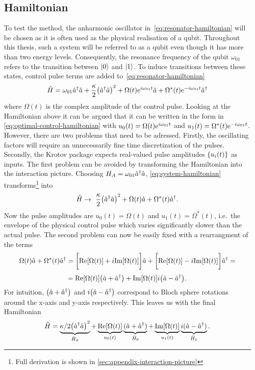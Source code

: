\documentclass[main.tex]{subfiles}
\begin{document}
\subsection{Hamiltonian}
To test the method, the anharmonic oscillator in~\cref{eq:resonator-hamiltonian} will be chosen as it is often used as the physical realisation of a qubit.
Throughout this thesis, such a system will be referred to as a qubit even though it has more than two energy levels.
Consequently, the resonance frequency of the qubit \( \omega_{01} \) refers to the transition between \( \ket{0} \) and \( \ket{1} \).
To induce transitions between these states, control pulse terms are added to~\cref{eq:resonator-hamiltonian}
\begin{equation}
    \hat{H} = \omega_{01} \hat{a}^\dagger\hat{a} + \frac{\kappa}{2} \qty(\hat{a}^\dagger\hat{a})^2 + \Omega(t)\mathrm{e}^{i\omega_{01}t}\hat{a} + \Omega^*(t)\mathrm{e}^{-i\omega_{01}t}\hat{a}^\dagger
    \label{eq:system-hamiltonian}
\end{equation}
where \( \Omega(t) \) is the complex amplitude of the control pulse.
Looking at the Hamiltonian above it can be argued that it can be written in the form in \cref{eq:optimal-control-hamiltonian} with \( u_0(t) = \Omega(t)\mathrm{e}^{i\omega_{01}t} \) and \( u_1(t) = \Omega^*(t)\mathrm{e}^{-i\omega_{01}t} \).
However, there are two problems that need to be adressed.
Firstly, the oscillating factors will require an unnecessarily fine time discretization of the pulses.
Secondly, the Krotov package expects real-valued pulse amplitudes \( \qty{u_i(t)} \) as inputs.
The first problem can be avoided by transforming the Hamiltonian into the interaction picture.
Choosing \( H_A = \omega_{01} \hat{a}^\dagger\hat{a} \), \cref{eq:system-hamiltonian} transforms\footnote{Full derivation is shown in \cref{sec:appendix-interaction-picture}} into
\begin{equation}
    \hat{H} \rightarrow~ \frac{\kappa}{2}\qty(\hat{a}^\dagger\hat{a})^2 + \Omega(t)\hat{a} + \Omega^*(t)\hat{a}^\dagger.
\end{equation}
Now the pulse amplitudes are \( u_0(t) = \Omega(t) \) and \( u_1(t) = \Omega^*(t) \), i.e.\ the envelope of the physical control pulse which varies significantly slower than the actual pulse.
The second problem can now be easily fixed with a rearrangment of the terms
\[ \Omega(t)\hat{a} + \Omega^*(t)\hat{a}^\dagger = \bigg[\text{Re}\qty[\Omega(t)]+i\text{Im}\qty[\Omega(t)]\bigg]\hat{a} + \bigg[\text{Re}\qty[\Omega(t)]-i\text{Im}\qty[\Omega(t)]\bigg]\hat{a}^\dagger = \]
\[ = \text{Re}\qty[\Omega(t)]\qty(\hat{a} + \hat{a}^\dagger) + \text{Im}\qty[\Omega(t)]i\qty(\hat{a} - \hat{a}^\dagger). \]
For intuition, \( \qty(\hat{a} + \hat{a}^\dagger) \) and \( i\qty(\hat{a} - \hat{a}^\dagger) \) correspond to Bloch sphere rotations around the x-axis and y-axis respectively. 
This leaves us with the final Hamiltonian
\begin{equation}
    \hat{H} = \underbrace{\kappa/2\qty(\hat{a}^\dagger\hat{a})^2}_{\hat{H}_d} + \underbrace{\text{Re}\qty[\Omega(t)]}_{u_0(t)}\underbrace{(\hat{a} + \hat{a}^\dagger)}_{\hat{H}_0} + \underbrace{\text{Im}\qty[\Omega(t)]}_{u_1(t)}\underbrace{i(\hat{a} - \hat{a}^\dagger)}_{\hat{H}_1} .
    \label{eq:system-hamiltonian-rotating}
\end{equation}
\end{document}
